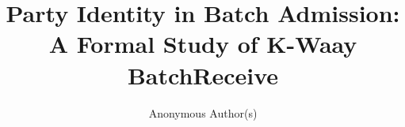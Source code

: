 \newif\ifanonymous
\anonymoustrue

\title{Party Identity in Batch Admission:\\
A Formal Study of K-Waay BatchReceive}

\ifanonymous
  \author{Anonymous Author(s)}
\else
  \author{Author information withheld during scaffold initialization}
\fi

\date{}
